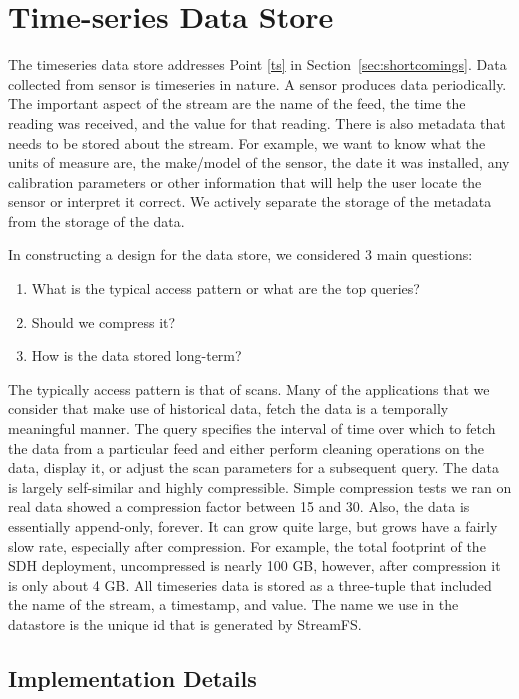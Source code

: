 \section{Time-series Data Store}

The timeseries data store addresses Point \ref{ts} in Section~\ref{sec:shortcomings}.
Data collected from sensor is timeseries in nature.  A sensor produces data periodically.  The important aspect of
the stream are the name of the feed, the time the reading was received, and the value for that reading.  There is also
metadata that needs to be stored about the stream.  For example, we want to know what the units of measure are, 
the make/model of the sensor, the date it was installed, any calibration parameters or other information that will help 
the user locate the sensor or interpret it correct.  We actively separate the storage of the metadata from the storage 
of the data.

In constructing a design for the data store, we considered 3 main questions:

\begin{enumerate}
\item What is the typical access pattern or what are the top queries?
\item Should we compress it?
\item How is the data stored long-term?
\end{enumerate}

The typically access pattern is that of scans.  Many of the applications that we consider that make use of historical data, fetch the data
is a temporally meaningful manner.  The query specifies the interval of time over which to fetch the data from a particular feed
and either perform cleaning operations on the data, display it, or adjust the scan parameters for a subsequent query.
The data is largely self-similar and highly compressible.  Simple compression tests we ran on real data showed a compression factor 
between 15 and 30.  Also, the data is essentially append-only, forever.  It can grow quite large, but grows have a fairly 
slow rate, especially after compression.  For example, the total footprint of the SDH deployment, uncompressed 
is nearly 100 GB, however, after compression it is only about 4 GB.
All timeseries data is stored as a three-tuple that included the name of the stream, a timestamp, and value.  The name we use in
the datastore is the unique id that is generated by StreamFS.  %

\subsection{Implementation Details}

